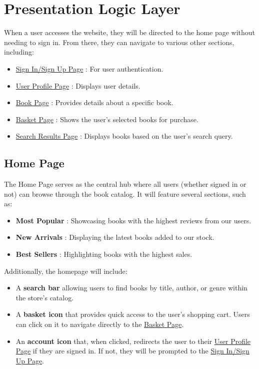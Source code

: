 \section{Presentation Logic Layer}
When a user accesses the website, they will be directed to the home page without needing to sign in. From there, they can navigate to various other sections, including:
\begin{itemize}
    \item \hyperref[sec:signin]{Sign In/Sign Up Page} : For user authentication.
    \item \hyperref[sec:profile]{User Profile Page} : Displays user details.
    \item \hyperref[sec:book]{Book Page} : Provides details about a specific book.
    \item \hyperref[sec:basket]{Basket Page} : Shows the user's selected books for purchase.
    \item \hyperref[sec:search]{Search Results Page} : Displays books based on the user’s search query.
\end{itemize}

\subsection{Home Page}
The Home Page serves as the central hub where all users (whether signed in or not) can browse through the book catalog. It will feature several sections, such as:
\begin{itemize}
    \item \textbf{Most Popular} : Showcasing books with the highest reviews from our users.
    \item \textbf{New Arrivals} : Displaying the latest books added to our stock.
    \item \textbf{Best Sellers} : Highlighting books with the highest sales.
\end{itemize}
Additionally, the homepage will include:
\begin{itemize}
    \item A \textbf{search bar} allowing users to find books by title, author, or genre within the store's catalog.
    \item A \textbf{basket icon} that provides quick access to the user's shopping cart. Users can click on it to navigate directly to the \hyperref[sec:basket]{Basket Page}.
    \item An \textbf{account icon} that, when clicked, redirects the user to their \hyperref[sec:profile]{User Profile Page} if they are signed in. If not, they will be prompted to the \hyperref[sec:signin]{Sign In/Sign Up Page}.
\end{itemize}


